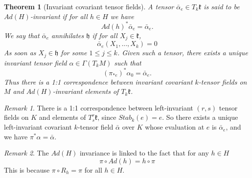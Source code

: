 \documentclass[a4paper,12pt,parskip=half*,chapterprefix=true,numbers=noendperiod]{scrreprt}
\newtheorem{theorem}{Theorem}[section]
\theoremstyle{definition}
\theoremstyle{remark}
\newtheorem*{remark}{Remark}
\begin{document}
\begin{theorem}[Invariant covariant tensor fields]
	A tensor $\bar{\alpha}_e\in T_k\mathfrak{k}$ is said to be $Ad(H)$-invariant if for all $h\in H$ we have
	\begin{equation*}
		Ad(h)^*\bar{\alpha}_e=\bar{\alpha}_e.
	\end{equation*}
	We say that $\bar{\alpha}_e$ annihilates $\mathfrak{h}$ if for all $X_j\in\mathfrak{k}$,
	\begin{equation*}
		\bar{\alpha}_e(X_1,...,X_k)=0
	\end{equation*}
	As soon as $X_j\in\mathfrak{h}$ for some $1\leq j\leq k$. Given such a tensor, there exists a unique invariant tensor field $\alpha\in\Gamma(T_kM)$ such that
	\begin{equation*}
		(\pi_{*e})^*\alpha_0=\bar{\alpha}_e.
	\end{equation*}	 
	Thus there is a 1:1 correspondence between invariant covariant $k$-tensor fields on $M$ and $Ad(H)$-invariant elements of $T_k\mathfrak{k}$.
\end{theorem}
\begin{remark}
	There is a 1:1 correspondence between left-invariant $(r,s)$ tensor fields on $K$ and elements of $T^r_s\mathfrak{k}$, since $Stab_k(e)=e$. So there exists a unique left-invariant covariant $k$-tensor field $\bar{\alpha}$ over $K$ whose evaluation at $e$ is $\bar{\alpha}_e$, and we have $\pi^*\alpha=\bar{\alpha}$.
\end{remark}
\begin{remark}
	The $Ad(H)$ invariance is linked to the fact that for any $h\in H$
	\begin{equation*}
		\pi\circ Ad(h)=h\circ\pi
	\end{equation*}
	This is because $\pi\circ R_h=\pi$ for all $h\in H$.
\end{remark}

\printbibliography
\end{document}
